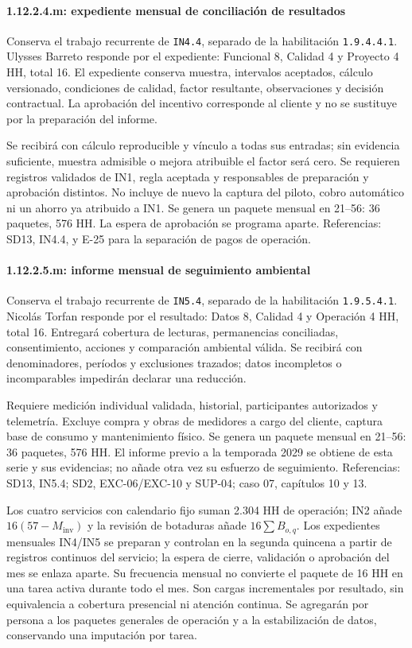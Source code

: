 \paragraph{1.12.2.4.m: expediente mensual de conciliación de resultados}
Conserva el trabajo recurrente de \texttt{IN4.4}, separado de la habilitación \texttt{1.9.4.4.1}. Ulysses Barreto responde por el expediente: Funcional 8, Calidad 4 y Proyecto 4 HH, total 16. El expediente conserva muestra, intervalos aceptados, cálculo versionado, condiciones de calidad, factor resultante, observaciones y decisión contractual. La aprobación del incentivo corresponde al cliente y no se sustituye por la preparación del informe.

Se recibirá con cálculo reproducible y vínculo a todas sus entradas; sin evidencia suficiente, muestra admisible o mejora atribuible el factor será cero. Se requieren registros validados de IN1, regla aceptada y responsables de preparación y aprobación distintos. No incluye de nuevo la captura del piloto, cobro automático ni un ahorro ya atribuido a IN1. Se genera un paquete mensual en 21--56: 36 paquetes, 576 HH. La espera de aprobación se programa aparte. Referencias: SD13, IN4.4, y E-25 para la separación de pagos de operación.

\paragraph{1.12.2.5.m: informe mensual de seguimiento ambiental}
Conserva el trabajo recurrente de \texttt{IN5.4}, separado de la habilitación \texttt{1.9.5.4.1}. Nicolás Torfan responde por el resultado: Datos 8, Calidad 4 y Operación 4 HH, total 16. Entregará cobertura de lecturas, permanencias conciliadas, consentimiento, acciones y comparación ambiental válida. Se recibirá con denominadores, períodos y exclusiones trazados; datos incompletos o incomparables impedirán declarar una reducción.

Requiere medición individual validada, historial, participantes autorizados y telemetría. Excluye compra y obras de medidores a cargo del cliente, captura base de consumo y mantenimiento físico. Se genera un paquete mensual en 21--56: 36 paquetes, 576 HH. El informe previo a la temporada 2029 se obtiene de esta serie y sus evidencias; no añade otra vez su esfuerzo de seguimiento. Referencias: SD13, IN5.4; SD2, EXC-06/EXC-10 y SUP-04; caso 07, capítulos 10 y 13.

Los cuatro servicios con calendario fijo suman 2.304 HH de operación; IN2 añade $16(57-M_{\mathrm{inv}})$ y la revisión de botaduras añade $16\sum B_{o,q}$. Los expedientes mensuales IN4/IN5 se preparan y controlan en la segunda quincena a partir de registros continuos del servicio; la espera de cierre, validación o aprobación del mes se enlaza aparte. Su frecuencia mensual no convierte el paquete de 16 HH en una tarea activa durante todo el mes. Son cargas incrementales por resultado, sin equivalencia a cobertura presencial ni atención continua. Se agregarán por persona a los paquetes generales de operación y a la estabilización de datos, conservando una imputación por tarea.
